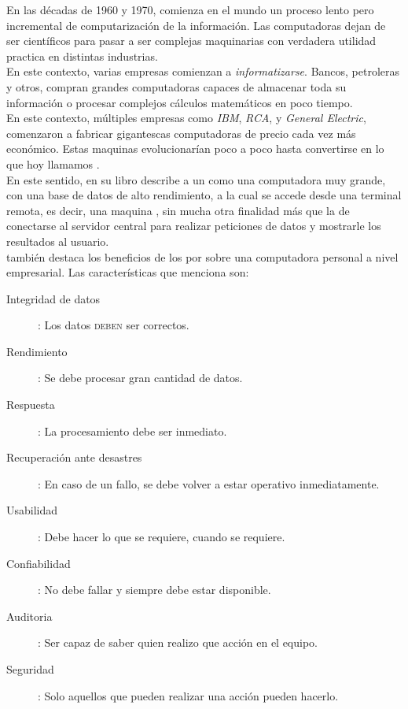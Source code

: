 En las décadas de 1960 y 1970, comienza en el mundo un proceso lento pero incremental de
computarización de la información. Las computadoras dejan de ser 
científicos para pasar a ser complejas maquinarias con verdadera utilidad practica
en distintas industrias.\\
En este contexto, varias empresas comienzan a \emph{informatizarse}. Bancos, petroleras
y otros, compran grandes computadoras capaces de almacenar toda su información o procesar
complejos cálculos matemáticos en poco tiempo.\\
En este contexto, múltiples empresas como \emph{IBM}, \emph{RCA}, y 
\emph{General Electric}, comenzaron a fabricar gigantescas computadoras de precio cada
vez más económico. Estas maquinas evolucionarían poco a poco hasta convertirse en lo que
hoy llamamos \mainframes.\\
En este sentido,  en su libro
  describe a un \mainframe
como una computadora muy grande, con una base de datos de alto rendimiento, a la cual se
accede desde una terminal remota, es decir, una maquina , sin mucha otra
finalidad más que la de conectarse al servidor central para realizar peticiones de datos
y mostrarle los resultados al usuario.\\
\citeauthor{Stephens:2008:BOOK} también destaca los beneficios de los \mainframes por
sobre una computadora personal a nivel empresarial. Las características que menciona son:
\begin{description}
	\item[Integridad de datos]: Los datos \textsc{deben} ser correctos.
	\item[Rendimiento]: Se debe procesar gran cantidad de datos.
	\item[Respuesta]: La procesamiento debe ser inmediato.
	\item[Recuperación ante desastres]: En caso de un fallo, se debe volver a estar
	operativo inmediatamente.
	\item[Usabilidad]: Debe hacer lo que se requiere, cuando se requiere.
	\item[Confiabilidad]: No debe fallar y siempre debe estar disponible.
	\item[Auditoria]: Ser capaz de saber quien realizo que acción en el equipo.
	\item[Seguridad]: Solo aquellos que pueden realizar una acción pueden hacerlo.
\end{description}
